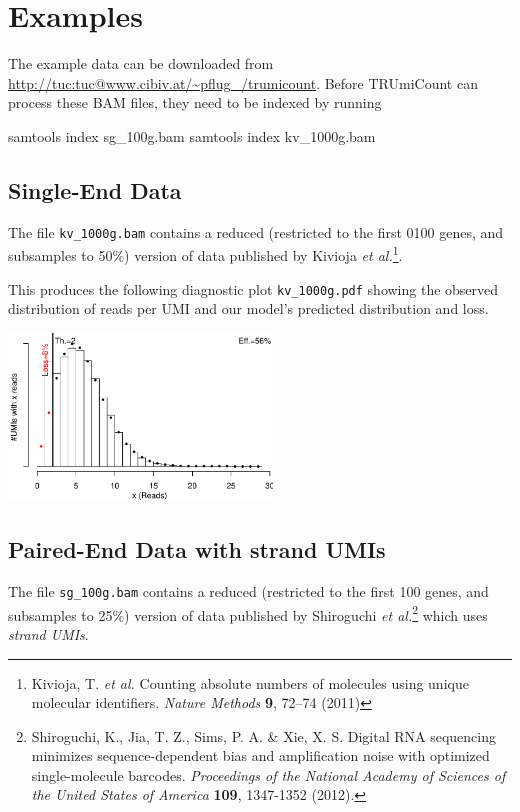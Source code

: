 \documentclass[10pt]{article}
\begin{document}
\pagebreak
\section{Examples}

The example data can be downloaded from \url{http://tuc:tuc@www.cibiv.at/~pflug_/trumicount}. Before TRUmiCount can process these BAM files, they need to be indexed by running

\begin{shellcode}
samtools index sg_100g.bam
samtools index kv_1000g.bam
\end{shellcode}

\subsection{Single-End Data}

The file \texttt{kv\_1000g.bam} contains a reduced (restricted to the first 0100 genes, and subsamples to 50\%) version of data published by Kivioja \textit{et al.}\footnote{Kivioja, T. \textit{et al.} Counting absolute numbers of molecules using unique molecular identifiers. \textit{Nature Methods} \textbf{9}, 72–74 (2011)}.


This produces the following diagnostic plot \texttt{kv\_1000g.pdf} showing the observed distribution of reads per UMI and our model's predicted distribution and loss.

{\centering \includegraphics[width=7cm]{../examples/kv_1000g.pdf}\\}

\pagebreak
\subsection{Paired-End Data with strand UMIs}

The file \texttt{sg\_100g.bam} contains a reduced (restricted to the first 100 genes, and subsamples to 25\%) version of data published by Shiroguchi \textit{et al.}\footnote{Shiroguchi, K., Jia, T. Z., Sims, P. A. \& Xie, X. S. Digital RNA sequencing minimizes sequence-dependent bias and amplification noise with optimized single-molecule barcodes. \textit{Proceedings of the National Academy of Sciences of the United States of America} \textbf{109}, 1347-1352 (2012).} which uses \emph{strand UMIs}.
\end{document}
